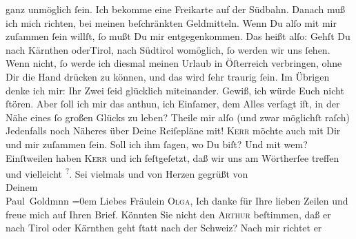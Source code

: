 \begin{ledgroupsized}[t]{13cm}
               ganz unmöglich ſein. Ich bekomme eine Freikarte auf der Südbahn. Danach muß ich mich richten, bei meinen beſchränkten
               Geldmitteln. Wenn Du alſo mit mir {\pb}zuſammen ſein
               willſt, ſo mußt Du mir entgegenkommen. Das heißt alſo: Gehſt Du nach \introOben{}Kärnthen oder\introOben{}{ }Tirol, nach Südtirol womöglich, ſo werden wir uns ſehen. Wenn  nicht, ſo werde ich diesmal meinen Urlaub in Öſterreich verbringen, ohne Dir die Hand drücken zu können, und das wird
               ſehr traurig ſein. Im Übrigen denke ich mir: Ihr Zwei ſeid glücklich miteinander.
               Gewiß, ich würde Euch nicht ſtören. Aber ſoll ich mir das anthun, ich Einſamer, {\pb}dem Alles verſagt iſt, in der Nähe eines ſo großen
               Glücks zu leben?\pend
           \pstart
           Theile mir alſo \introOben{}(und zwar möglichſt raſch)\introOben{}{ } Jedenfalls noch Näheres über Deine Reiſepläne mit! \textsc{Kerr} möchte auch mit Dir und mir zuſammen ſein. Soll ich ihm ſagen, wo Du biſt? Und
               mit wem? Einſtweilen haben \textsc{Kerr} und ich feſtgeſetzt, daß wir uns am Wörtherſee treffen und vielleicht \label{K_L03071-2v}\label{K_L03071-2h}\substVorne{}\textsuperscript{?}\substDazwischen{}.\substHinten{}\pend
           \pstart
           {\pb}Sei vielmals und von Herzen gegrüßt von {\\[\baselineskip]}Deinem {\\[\baselineskip]}\spacefill\mbox{Paul Goldmnn}\pend
           \leftskip=0em{}{\bigskip}\pstart
           \noindent{}Liebes Fräulein \textsc{Olga}, Ich
               danke für Ihre lieben Zeilen und freue mich auf Ihren Brief. Könnten Sie nicht den
                  \textsc{Arthur} beſtimmen, daß er nach Tirol oder Kärnthen geht
               ſtatt nach der Schweiz? Nach mir richtet er

\end{ledgroupsized}
